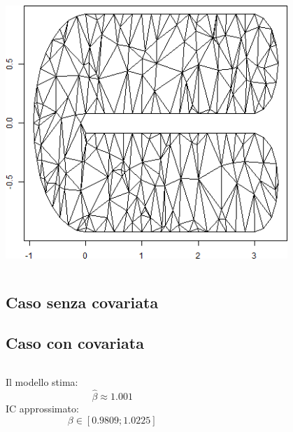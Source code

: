 \documentclass[landscape,9pt]{beamer}                           %
\begin{document}
\begin{frame}
\begin{columns}
\begin{column}{0.4\textwidth}
		\begin{center}
		\includegraphics[width=0.8\textwidth]{Immagini/DomC_Triangolazione.png}
		\end{center}
	\end{column}
\end{columns}
\end{frame}

\subsection{Caso senza covariata}
\begin{frame}
\begin{center}
\end{center}
\end{frame}

\subsection{Caso con covariata}
\begin{frame}
\begin{columns}
	\begin{column}{0.3\textwidth}
	Il modello stima:
	$$
	\hat{\beta} \approx 1.001 
	$$
	IC approssimato:
	$$
	\beta \in [0.9809;1.0225]
	$$
	\end{column}
	\begin{column}{0.6\textwidth}	
		\begin{flushright}		
		\end{flushright}
	\end{column}
\end{columns}
\end{frame}
\end{document}
